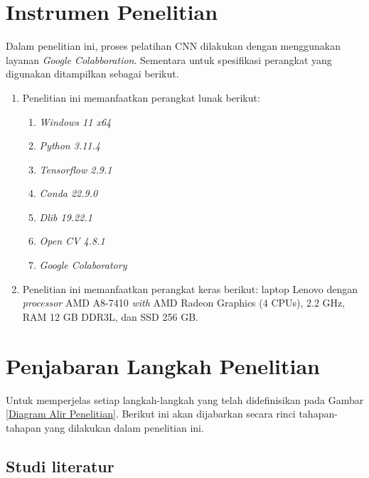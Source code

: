 

    

\section{Instrumen Penelitian}

Dalam penelitian ini, proses pelatihan CNN dilakukan dengan menggunakan layanan \textit{Google Colabboration}. Sementara untuk spesifikasi perangkat yang digunakan ditampilkan sebagai berikut.


    \begin{enumerate}
        \item Penelitian ini memanfaatkan perangkat lunak berikut:

        \begin{enumerate}
            \item \textit{Windows 11 x64}
            \item \textit{Python 3.11.4}
            \item \textit{Tensorflow 2.9.1}
            \item \textit{Conda 22.9.0} \item \textit {Dlib 19.22.1}
            \item \textit{Open CV 4.8.1}
            \item \textit{Google Colaboratory}
        \end{enumerate}
        
        \item Penelitian ini memanfaatkan perangkat keras berikut: laptop Lenovo dengan \textit{processor} AMD  A8-7410 \textit{with} AMD Radeon Graphics (4 CPUs),  2.2 GHz, RAM 12 GB DDR3L, dan SSD 256 GB.

    \end{enumerate}
    
\section{Penjabaran Langkah Penelitian}

    Untuk memperjelas setiap langkah-langkah yang telah didefinisikan pada Gambar \ref{Diagram Alir Penelitian}. Berikut ini akan dijabarkan secara rinci tahapan-tahapan yang dilakukan dalam penelitian ini.
    
\subsection{Studi literatur}

